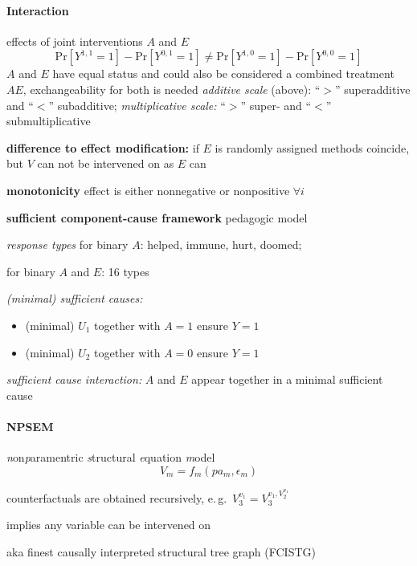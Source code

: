 \documentclass[8pt,twoside]{extarticle}
\begin{document}
\begin{multicols}{2}
\paragraph{Interaction} effects of joint interventions $A$ and $E$ 
$$\mathrm{Pr}\left[Y^{1,1}{=}1\right] - \mathrm{Pr}\left[Y^{0,1}{=}1\right] \neq \mathrm{Pr}\left[Y^{1,0}{=}1\right] - \mathrm{Pr}\left[Y^{0,0}{=}1\right]$$
$A$ and $E$ have equal status and could also be considered a combined treatment $AE$, exchangeability for both is needed
\textit{additive scale} (above): ``$>$'' superadditive and ``$<$'' subadditive;
\textit{multiplicative scale:} ``$>$'' super- and ``$<$'' submultiplicative

\noindent \textbf{difference to effect modification:} if $E$ is randomly assigned methods coincide, but $V$ can not be intervened on as $E$ can 

\noindent \textbf{monotonicity} effect is either nonnegative or nonpositive $\forall i$

\noindent \textbf{sufficient component-cause framework} pedagogic model

\noindent \textit{response types} for binary $A$: helped, immune, hurt, doomed;

\noindent for binary $A$ and $E$: 16 types

\noindent \textit{(minimal) sufficient causes: }
\begin{itemize}[itemsep=0em, topsep=0pt, partopsep=0pt,parsep=0pt, leftmargin=1.5em]
\setlength{\itemsep}{0pt}%
\setlength{\parskip}{0pt}
\item (minimal) $U_1$ together with $A=1$ ensure $Y=1$
\item (minimal) $U_2$ together with $A=0$ ensure $Y=1$
\end{itemize}
\textit{sufficient cause interaction:} $A$ and $E$ appear together in a minimal sufficient cause


\paragraph{NPSEM} \textit{n}on\textit{p}aramentric \textit{s}tructural \textit{e}quation \textit{m}odel
$$V_m = f_m(pa_m, \epsilon_m)$$

\noindent counterfactuals are obtained recursively, e.\,g.\  $V_3^{v_1} = V_3^{v_1, V_2^{v_1}}$

\noindent implies any variable can be intervened on

\noindent aka finest causally interpreted structural tree graph (FCISTG)


\end{multicols}
\end{document}
